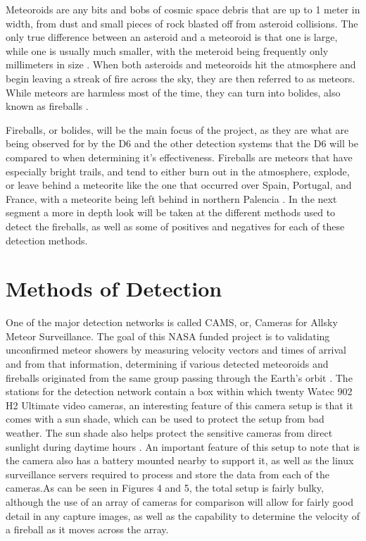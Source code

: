 Meteoroids are any bits and bobs of cosmic space debris that are up to 1 meter in width, from dust and small pieces of rock blasted off from asteroid collisions. The only true difference between an asteroid and a meteoroid is that one is large, while one is usually much smaller, with the meteroid being frequently only millimeters in size \cite{atkinson_2018}. 
When both asteroids and meteoroids hit the atmosphere and begin leaving a streak of fire across the sky, they are then referred to as meteors. 
While meteors are harmless most of the time, they can turn into bolides, also known as fireballs \cite{atkinson_2018}. 

Fireballs, or bolides, will be the main focus of the project, as they are what are being observed for by the D6 and the other detection systems that the D6 will be compared to when determining it's effectiveness. 
Fireballs are meteors that have especially bright trails, and tend to either burn out in the atmosphere, explode, or leave behind a meteorite like the one that occurred over Spain, Portugal, and France, with a meteorite being left behind in northern Palencia \cite{Villabeto}. 
In the next segment a more in depth look will be taken at the different methods used to detect the fireballs, as well as some of positives and negatives for each of these detection methods.

\section{Methods of Detection}

One of the major detection networks is called CAMS, or, Cameras for Allsky Meteor Surveillance. 
The goal of this NASA funded project is to validating unconfirmed meteor showers by measuring velocity vectors and times of arrival and from that information, determining if various detected meteoroids and fireballs originated from the same group passing through the Earth's orbit \cite{jenniskens}. 
The stations for the detection network contain a box within which twenty Watec 902 H2 Ultimate video cameras, an interesting feature of this camera setup is that it comes with a sun shade, which can be used to protect the setup from bad weather. 
The sun shade also helps protect the sensitive cameras from direct sunlight during daytime hours \cite{jenniskens}. 
An important feature of this setup to note that is the camera also has a battery mounted nearby to support it, as well as the linux surveillance servers required to process and store the data from each of the cameras.As can be seen in Figures 4 and 5, the total setup is fairly bulky, although the use of an array of cameras for comparison will allow for fairly good detail in any capture images, as well as the capability to determine the velocity of a fireball as it moves across the array.

